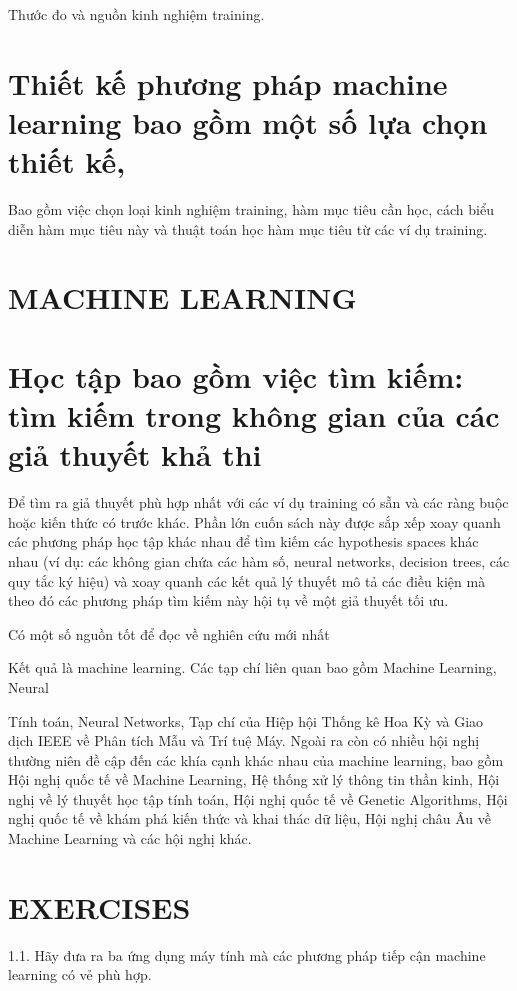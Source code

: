 Thước đo và nguồn kinh nghiệm training.

\section{Thiết kế phương pháp machine learning bao gồm một số lựa chọn thiết kế,}

Bao gồm việc chọn loại kinh nghiệm training, hàm mục tiêu cần học, cách biểu diễn hàm mục tiêu này và thuật toán học hàm mục tiêu từ các ví dụ training.

\section{MACHINE LEARNING}

\section{Học tập bao gồm việc tìm kiếm: tìm kiếm trong không gian của các giả thuyết khả thi}

Để tìm ra giả thuyết phù hợp nhất với các ví dụ training có sẵn và các ràng buộc hoặc kiến ​​thức có trước khác. Phần lớn cuốn sách này được sắp xếp xoay quanh các phương pháp học tập khác nhau để tìm kiếm các hypothesis spaces khác nhau (ví dụ: các không gian chứa các hàm số, neural networks, decision trees, các quy tắc ký hiệu) và xoay quanh các kết quả lý thuyết mô tả các điều kiện mà theo đó các phương pháp tìm kiếm này hội tụ về một giả thuyết tối ưu.

Có một số nguồn tốt để đọc về nghiên cứu mới nhất

Kết quả là machine learning. Các tạp chí liên quan bao gồm Machine Learning, Neural

Tính toán, Neural Networks, Tạp chí của Hiệp hội Thống kê Hoa Kỳ và Giao dịch IEEE về Phân tích Mẫu và Trí tuệ Máy. Ngoài ra còn có nhiều hội nghị thường niên đề cập đến các khía cạnh khác nhau của machine learning, bao gồm Hội nghị quốc tế về Machine Learning, Hệ thống xử lý thông tin thần kinh, Hội nghị về lý thuyết học tập tính toán, Hội nghị quốc tế về Genetic Algorithms, Hội nghị quốc tế về khám phá kiến ​​thức và khai thác dữ liệu, Hội nghị châu Âu về Machine Learning và các hội nghị khác.

\section{EXERCISES}

1.1. Hãy đưa ra ba ứng dụng máy tính mà các phương pháp tiếp cận machine learning có vẻ phù hợp.

